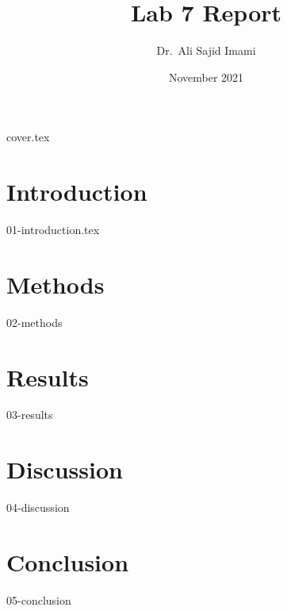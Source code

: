 \documentclass[letterpaper,12pt,oneside]{article}
\title{Lab 7 Report}
\author{Dr.~Ali Sajid Imami}
\date{November 2021}
\begin{document}
{cover.tex}
\clearpage

\tableofcontents

\section{Introduction}

{01-introduction.tex}

\section{Methods}

{02-methods}

\section{Results}

{03-results}

\section{Discussion}

{04-discussion}

\section{Conclusion}

{05-conclusion}

\clearpage
\printbibliography[title=References]

\clearpage
\end{document}
